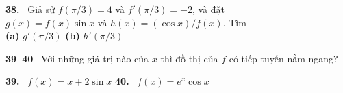 \begin{minipage}[t]{0.485\textwidth}
\textbf{38.} \ Giả sử $f(\pi/3) = 4$ và $f'(\pi/3) = -2$, và đặt\\
$g(x) = f(x)\sin x$ và $h(x) = (\cos x)/f(x)$. Tìm\\[1mm]
\hspace*{5.5mm}\textbf{(a)} $g'(\pi/3)$ \hfill \textbf{(b)} $h'(\pi/3)$\hspace*{15mm}\null\par\vspace{3mm}

{\color{stewartcyan}\textbf{39--40}} \ Với những giá trị nào của $x$ thì đồ thị của $f$ có tiếp tuyến nằm ngang?\par\vspace{2mm}

\textbf{39.} \ $f(x) = x + 2\sin x$ \hfill \textbf{40.} \ $f(x) = e^x \cos x$

\end{minipage}%
\hfill
